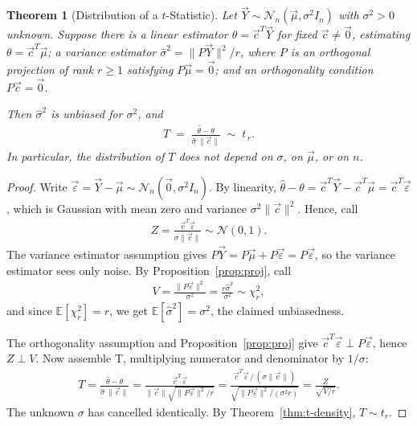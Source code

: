 \documentclass[11pt]{article}
\theoremstyle{definition}
\theoremstyle{plain}
\newtheorem{theorem}{Theorem}[section]
\theoremstyle{remark}
\begin{document}
\begin{theorem}[Distribution of a $t$-Statistic]\label{thm:general-t}
    Let $\vec{Y} \sim \mathcal{N}_n(\vec{\mu}, \sigma^2 I_n)$ with $\sigma^2 > 0$ unknown. Suppose there is a linear estimator $\hat{\theta} = \vec{c}^T\vec{Y}$ for fixed $\vec{c} \neq \vec{0}$, estimating $\theta = \vec{c}^T\vec{\mu}$; a variance estimator $\hat{\sigma}^2 = \|P\vec{Y}\|^2/r$, where $P$ is an orthogonal projection of rank $r \geq 1$ satisfying $P\vec{\mu} = \vec{0}$; and an orthogonality condition $P\vec{c} = \vec{0}$.

    Then $\hat{\sigma}^2$ is unbiased for $\sigma^2$, and
    \begin{align}
        T \;=\; \frac{\hat{\theta} - \theta}{\hat{\sigma}\,\|\vec{c}\|} \;\sim\; t_{\,r}.
    \end{align}
    In particular, the distribution of $T$ does not depend on $\sigma$, on $\vec{\mu}$, or on $n$.
\end{theorem}
\begin{proof}
    Write $\vec{\varepsilon} = \vec{Y} - \vec{\mu} \sim \mathcal{N}_n(\vec{0},\sigma^2 I_n)$. By linearity, $\hat{\theta} - \theta = \vec{c}^T\vec{Y} - \vec{c}^T\vec{\mu} = \vec{c}^T\vec{\varepsilon}$, which is Gaussian with mean zero and variance $\sigma^2\|\vec{c}\|^2$. Hence, call
    \begin{align}
        Z = \frac{\vec{c}^T\vec{\varepsilon}}{\sigma\|\vec{c}\|} \sim \mathcal{N}(0,1).
    \end{align}
    The variance estimator assumption gives $P\vec{Y} = P\vec{\mu} + P\vec{\varepsilon} = P\vec{\varepsilon}$, so the variance estimator sees only noise. By Proposition~\ref{prop:proj}, call
    \begin{align}
        V = \frac{\|P\vec{\varepsilon}\|^2}{\sigma^2} = \frac{r\hat{\sigma}^2}{\sigma^2} \sim \chi^2_r,
    \end{align}
    and since $\mathbb{E}[\chi^2_r] = r$, we get $\mathbb{E}[\hat{\sigma}^2] = \sigma^2$, the claimed unbiasedness.

    The orthogonality assumption and Proposition~\ref{prop:proj} give $\vec{c}^T\vec{\varepsilon} \perp P\vec{\varepsilon}$, hence $Z \perp V$. Now assemble T, multiplying numerator and denominator by $1/\sigma$:
    \begin{align}
        T = \frac{\hat{\theta} - \theta}{\hat{\sigma}\,\|\vec{c}\|} =\frac{\vec{c}^T\vec{\varepsilon}}{\|\vec{c}\|\sqrt{\|P\vec{\varepsilon}\|^2/r}}
          = \frac{\vec{c}^T\vec{\varepsilon}\,/\,(\sigma\|\vec{c}\|)}{\sqrt{\|P\vec{\varepsilon}\|^2/(\sigma^2 r)}}
          = \frac{Z}{\sqrt{V/r}}.
    \end{align}
    The unknown $\sigma$ has cancelled identically. By Theorem~\ref{thm:t-density}, $T \sim t_r$.
\end{proof}
\end{document}
